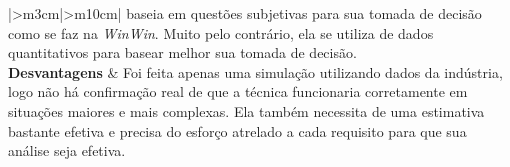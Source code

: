 \begin{longtable}{{|>{\centering\arraybackslash}m{3cm}|>{\centering\arraybackslash}m{10cm}|}}
baseia em questões subjetivas para sua tomada de decisão como se faz na
\textit{WinWin}. Muito pelo contrário, ela se utiliza de dados quantitativos para basear melhor sua tomada de decisão.                                                                                                                \\ \hline \textbf{Desvantagens}                                       & Foi feita apenas uma simulação utilizando dados da indústria, logo não há confirmação real de que a técnica funcionaria corretamente em situações maiores e mais complexas. Ela também necessita de uma estimativa bastante efetiva e precisa do esforço atrelado a cada requisito para que sua análise seja efetiva. \\ \hline

\end{longtable}



